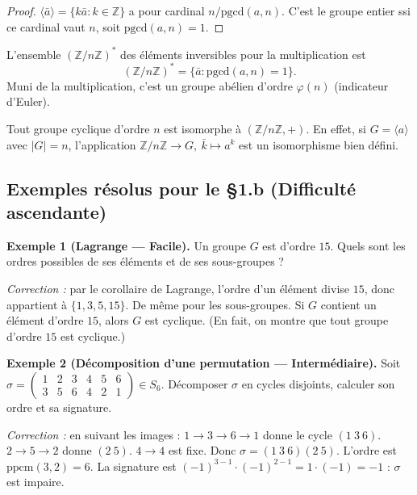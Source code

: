 \begin{proof}
$\langle \bar{a} \rangle = \{k \bar{a} : k \in \mathbb{Z}\}$ a pour cardinal $n / \mathrm{pgcd}(a, n)$. C'est le groupe entier ssi ce cardinal vaut $n$, soit $\mathrm{pgcd}(a, n) = 1$.
\end{proof}

\begin{theoreme}
L'ensemble $(\mathbb{Z}/n\mathbb{Z})^*$ des éléments inversibles pour la multiplication est
\[ (\mathbb{Z}/n\mathbb{Z})^* = \{\bar{a} : \mathrm{pgcd}(a, n) = 1\}. \]
Muni de la multiplication, c'est un groupe abélien d'ordre $\varphi(n)$ (indicateur d'Euler).
\end{theoreme}

\begin{remarque}
Tout groupe cyclique d'ordre $n$ est isomorphe à $(\mathbb{Z}/n\mathbb{Z}, +)$. En effet, si $G = \langle a \rangle$ avec $|G| = n$, l'application $\mathbb{Z}/n\mathbb{Z} \to G,\ \bar{k} \mapsto a^k$ est un isomorphisme bien défini.
\end{remarque}

\subsection{Exemples résolus pour le §1.b (Difficulté ascendante)}

\textbf{Exemple 1 (Lagrange --- Facile).}
Un groupe $G$ est d'ordre $15$. Quels sont les ordres possibles de ses éléments et de ses sous-groupes ?

\textit{Correction :} par le corollaire de Lagrange, l'ordre d'un élément divise $15$, donc appartient à $\{1, 3, 5, 15\}$. De même pour les sous-groupes. Si $G$ contient un élément d'ordre $15$, alors $G$ est cyclique. (En fait, on montre que tout groupe d'ordre $15$ est cyclique.)

\medskip

\textbf{Exemple 2 (Décomposition d'une permutation --- Intermédiaire).}
Soit $\sigma = \begin{pmatrix} 1 & 2 & 3 & 4 & 5 & 6 \\ 3 & 5 & 6 & 4 & 2 & 1 \end{pmatrix} \in S_6$. Décomposer $\sigma$ en cycles disjoints, calculer son ordre et sa signature.

\textit{Correction :} en suivant les images : $1 \to 3 \to 6 \to 1$ donne le cycle $(1\ 3\ 6)$. $2 \to 5 \to 2$ donne $(2\ 5)$. $4 \to 4$ est fixe. Donc $\sigma = (1\ 3\ 6)(2\ 5)$.
L'ordre est $\mathrm{ppcm}(3, 2) = 6$. La signature est $(-1)^{3-1} \cdot (-1)^{2-1} = 1 \cdot (-1) = -1$ : $\sigma$ est impaire.

